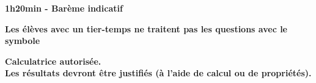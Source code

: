 \documentclass[12pt,a4paper]{book}
\begin{document}
	\graphicspath{{images/}}
	
	\begin{center}
		
		
	\end{center}
	
	\begin{center}\textbf{1h20min - Barème indicatif}\end{center}
	\begin{center}\textbf{Les élèves avec un tier-temps ne traitent pas les questions avec  le symbole }\end{center}
	\begin{center}\textbf{Calculatrice autorisée.\\Les résultats devront être justifiés (à l'aide de calcul ou de propriétés).}\end{center}

\end{document}
